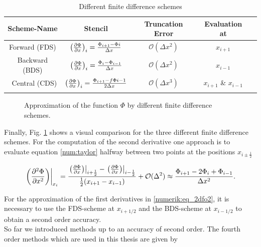 \bgroup\large
\begin{table}[!bp]
\centering
\def\arraystretch{1.5}%
\begin{tabular}{c c c c c}\toprule
Scheme-Name & Stencil & Truncation Error & Evaluation at\\[0.5ex]
\midrule
Forward  (FDS) & $\left(\pdn[\Phi]{x}\right)_i =  \frac{\Phi_{i+1} - \Phi{i}}   {\Delta x}$ & $\mathcal{O}(\Delta x^2)$  &$x_{i+1}$\\
Backward (BDS) & $\left(\pdn[\Phi]{x}\right)_i = \frac{\Phi_{i}    - \Phi_{i-1}}{\Delta x}$  &$ \mathcal{O}(\Delta x^2)$ & $x_{i-1}$\\\
Central  (CDS) & $\left(\pdn[\Phi]{x}\right)_i = \frac{\Phi_{i+1}  - f\Phi{i-1}}{2\Delta x}$ &$ \mathcal{O}(\Delta x^3)$& $x_{i+1}$ \& $x_{i-1}$\\
\\
\bottomrule
\end{tabular}
\caption{Different finite difference schemes}
\label{num:df_table}
\end{table}
\egroup

\clearpage

\begin{figure}[!btp]
  \centering
  \caption{Approximation of the function $\Phi$ by different finite difference schemes.}
  \label{num:fd_image}
\end{figure}

Finally, Fig. \ref{num:fd_image} shows a visual comparison for the three different finite difference schemes.
For the computation of the second derivative one approach is to evaluate equation \ref{num:taylor} halfway between two points at the positions $x_{i\pm\frac{1}{2}}$

\begin{align}
    \label{numerik:eq_2dfo2}
    \left.\left(\pdn[^2\Phi]{x^2}\right)\right|_{x_i} =
     \frac{\left.\left(\pdn[\Phi]{x}\right)\right|_{i+\frac{1}{2}}-
     \left.\left(\pdn[\Phi]{x}\right)\right|_{i-\frac{1}{2}}}
    {\frac{1}{2}(x_{i+1} - x_{i-1})} + \mathcal{O}(\Delta ^2)  \approx
    \frac{\Phi_{i+1} - 2\Phi_i + \Phi_{i-1}}{\Delta x^2}.
\end{align}

For the approximation of the first derivatives in \ref{numerik:eq_2dfo2},
it is necessary to use the FDS-scheme at $x_{i+1/2}$ and the BDS-scheme at $x_{i-1/2}$ to obtain
a second order accuracy.\\
So far we introduced methods up to an accuracy of second order. The fourth order methods which are used in this thesis are given by

